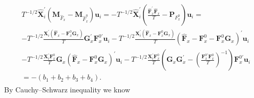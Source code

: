 \documentclass[12pt,a4paper,hyperref]{article}
\begin{document}
\begin{align}
\begin{split}
&T^{-1/2} \hat{\boldsymbol{X}}^{'}_{i} \left(\boldsymbol{M}_{\hat{F}_{x}}-\boldsymbol{M}_{\hat{F}^{0}_{x}} \right) \boldsymbol{u}_{i}= -T^{-1/2} \hat{\boldsymbol{X}}^{'}_{i} \left( \frac{\hat{\boldsymbol{F}}^{'}_{x}\hat{\boldsymbol{F}}_{x}  }{T} -\boldsymbol{P}_{F^{0}_{x}}  \right) \boldsymbol{u}_{i}= \\
&  -T^{-1/2} \frac{\boldsymbol{X}^{'}_{i}\left(\hat{\boldsymbol{F}}_{x}-\boldsymbol{F}^{0}_{x}\boldsymbol{G}_{x}  \right)}{T}\boldsymbol{G}^{'}_{x}\boldsymbol{F}^{0'}_{x}\boldsymbol{u}_{i}-T^{-1/2} \frac{\boldsymbol{X}^{'}_{i}\left(\hat{\boldsymbol{F}}_{x}-\boldsymbol{F}^{0}_{x} \boldsymbol{G}_{x}  \right)}{T}\left( \hat{\boldsymbol{F}}_{x}-\boldsymbol{F}^{0}_{x}-\boldsymbol{F}^{0}_{x}\boldsymbol{G}_{x}   \right)^{'}\boldsymbol{u}_{i} \\
& -T^{-1/2} \frac{\boldsymbol{X}^{'}_{i}\boldsymbol{F}^{0}_{x} }{T}\boldsymbol{G}_{x} \left( \hat{\boldsymbol{F}}_{x}-\boldsymbol{F}^{0}_{x}\boldsymbol{G}_{x}   \right)^{'}\boldsymbol{u}_{i}-T^{-1/2} \frac{\boldsymbol{X}^{'}_{i} \boldsymbol{F}^{0}_{x}}{T} \left( \boldsymbol{G}_{x}\boldsymbol{G}^{'}_{x}-\left( \frac{\boldsymbol{F}^{0'}_{x} \boldsymbol{F}^{0}_{x} }{T} \right)^{-1}      \right)\boldsymbol{F}^{0'}_{x}\boldsymbol{u}_{i} \\
&= -\left( b_{1}+ b_{2}+b_{3}+b_{4} \right).
\end{split}
\end{align}
By Cauchy–Schwarz inequality we know
\end{document}
